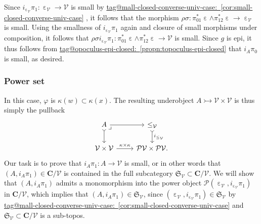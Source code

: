 \documentclass{amsart}
\makeatletter
\newcommand\bC{\mathbf{C}}
\newcommand\cV{\mathcal{V}}
\newcommand\ein{\mathrel{\varepsilon}}
\newcommand\fS{\mathfrak{S}}
\newcommand\pb[1][rd]{\ar[#1, phantom, "\lrcorner", pos=0]}
\renewcommand\phi{\varphi}
\newcommand\pow{\mathcal{P}}
\newcommand\tto{\rightarrowtail}
\newcommand\unein{{\ein}}
\newcommand\tagword[1]{\csname tag@#1\endcsname}
\def\label@tag#1:#2\@nil{#1}
\newcommand\labeltag[1]{\label@tag#1:\@nil}
\newcommand\jref[1]{%
  \texorpdfstring%
    {\hyperref[#1]{\tagword{\labeltag{#1}}~\ref*{#1}}}%
    {\tagword{\labeltag{#1}}~\ref*{#1}}%
}
\theoremstyle{definition}
\theoremstyle{remark}
\theoremstyle{plainwithref}
\makeatother
\begin{document}
Since \( i_{\ein_{\cV}} \pi_1 \colon \unein_{\cV} \to \cV \) is small by \jref{cor:small-closed-converse-univ-case}, it follows that the morphism \( \rho \sigma \colon \pi_{01}^* \unein \wedge \pi_{12}^* \unein \to \unein_{\cV} \) is small.
Using the smallness of \( i_{\ein_{\cV}} \pi_1 \) again and closure of small morphisms under composition, it follows that \( \rho \sigma i_{\ein_{\cV}} \pi_1 \colon \pi_{01}^* \unein \wedge \pi_{12}^* \unein \to \cV \) is small.
Since \( g \) is epi, it thus follows from \jref{propn:topoculus-epi-closed} that \( i_A \pi_0 \) is small, as desired.

\subsubsection{Power set}
In this case, \( \phi \) is \( \kappa(w) \subset \kappa(x) \).
The resulting underobject \( A \tto \cV \times \cV \) is thus simply the pullback
\[
  \begin{tikzcd}
    A \pb \ar[d, >->] \ar[r] & \le_{\cV} \ar[d, "i_{\le_{\cV}}", >->] \\
    \cV \times \cV \ar[r, "\kappa \times \kappa"] & \pow \cV \times \pow \cV.
  \end{tikzcd}
\]
Our task is to prove that \( i_A \pi_1 \colon A \to \cV \) is small, or in other words that \( (A, i_A \pi_1) \in \bC / \cV \) is contained in the full subcategory \( \fS_{\cV} \subset \bC / \cV \).
We will show that \( (A, i_A \pi_1) \) admits a monomorphism into the power object \( \pow (\ein_{\cV}, i_{\ein_{\cV}} \pi_1) \) in \( \bC / \cV \), which implies that \( (A, i_A \pi_1) \in \fS_\cV \), since \( (\ein_{\cV}, i_{\ein_{\cV}} \pi_1) \in \fS_\cV \) by \jref{cor:small-closed-converse-univ-case} and \( \fS_\cV \subset \bC / \cV \) is a sub-topos.
\end{document}
